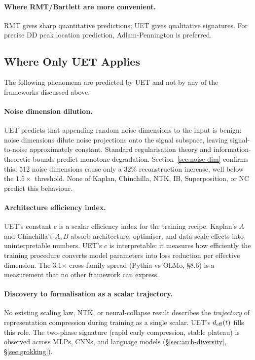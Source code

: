 \paragraph{Where RMT/Bartlett are more convenient.}
RMT gives sharp quantitative predictions; UET gives qualitative signatures.
For precise DD peak location prediction, Adlam-Pennington is preferred.

\subsection{Where Only UET Applies}
\label{sec:uet-unique}

The following phenomena are predicted by UET and not by any of the frameworks
discussed above.

\paragraph{Noise dimension dilution.}
UET predicts that appending random noise dimensions to the input is benign:
noise dimensions dilute noise projections onto the signal subspace, leaving
signal-to-noise approximately constant.
Standard regularisation theory and information-theoretic bounds predict monotone
degradation.
Section~\ref{sec:noise-dim} confirms this: 512 noise dimensions cause only a
32\% reconstruction increase, well below the $1.5\times$ threshold.
None of Kaplan, Chinchilla, NTK, IB, Superposition, or NC predict this behaviour.

\paragraph{Architecture efficiency index.}
UET's constant $c$ is a scalar efficiency index for the training recipe.
Kaplan's $A$ and Chinchilla's $A, B$ absorb architecture, optimiser, and
data-scale effects into uninterpretable numbers.
UET's $c$ is interpretable: it measures how efficiently the training procedure
converts model parameters into loss reduction per effective dimension.
The 3.1$\times$ cross-family spread (Pythia vs OLMo, §8.6) is a measurement that
no other framework can express.

\paragraph{Discovery to formalisation as a scalar trajectory.}
No existing scaling law, NTK, or neural-collapse result describes the
\emph{trajectory} of representation compression during training as a single
scalar.
UET's $d_{\mathrm{eff}}(t)$ fills this role.
The two-phase signature (rapid early compression, stable plateau) is observed
across MLPs, CNNs, and language models (§\ref{sec:arch-diversity},
§\ref{sec:grokking}).

